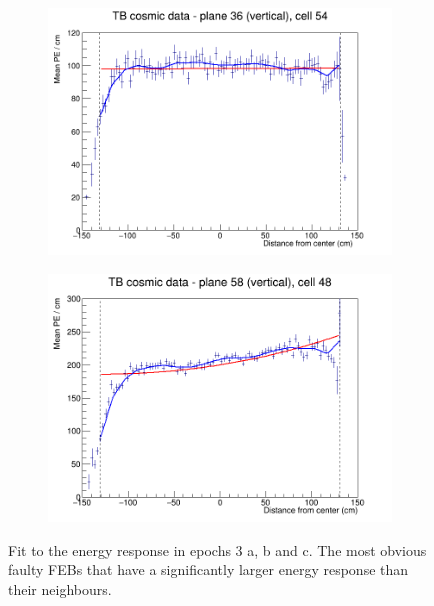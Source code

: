 \documentclass[12pt,a4paper]{article}
\begin{document}
\begin{figure}[h]
  \begin{subfigure}{0.5\textwidth}
    \includegraphics[width=\linewidth]{RelativeCalibrationResults/ep3abc_036_054.png}
  \end{subfigure}
  \begin{subfigure}{0.5\textwidth}
    \includegraphics[width=\linewidth]{RelativeCalibrationResults/ep3abc_058_048_ExtendedRange.png}
  \end{subfigure}
  \caption{Fit to the energy response in epochs 3 a, b and c. The most obvious faulty FEBs that have a significantly larger energy response than their neighbours.}
  \label{figAttenfitResultsEpoch3abc_FaultyFEBs}
\end{figure}
\end{document}

